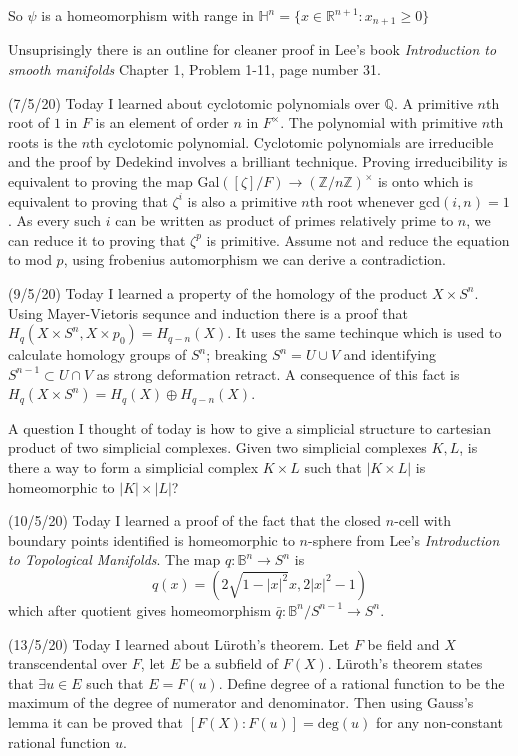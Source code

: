 \documentclass[12pt,a4paper]{article}
\begin{document}
So $\psi$ is a homeomorphism with range in $\mathbb{H}^n = \{x\in \mathbb{R}^{n+1} : x_{n+1} \ge 0\}$

Unsuprisingly there is an outline for cleaner proof in Lee's book \textit{Introduction to smooth manifolds} Chapter 1, Problem 1-11, page number 31.

(7/5/20) Today I learned about cyclotomic polynomials over $\mathbb{Q}$. 
A primitive $n$th root of $1$ in $F$ is an element of order $n$ in $F^{\times}$. The polynomial with primitive $n$th roots is the $n$th cyclotomic polynomial. Cyclotomic polynomials are irreducible and the proof by Dedekind involves a brilliant technique. Proving irreducibility is equivalent to proving the map Gal$([\zeta]/F) \rightarrow (\mathbb{Z}/n\mathbb{Z})^{\times}$ is onto which is equivalent to proving that $\zeta^i$ is also a primitive $n$th root whenever gcd$(i,n)=1$. As every such $i$ can be written as product of primes relatively prime to $n$, we can reduce it to proving that $\zeta^p$ is primitive. Assume not and reduce the equation to mod $p$, using frobenius automorphism we can derive a contradiction.

(9/5/20) Today I learned a property of the homology of the product $X\times S^{n}$. Using Mayer-Vietoris sequnce and induction there is a proof that $H_q(X\times S^n, X \times p_0) = H_{q-n}(X)$. It uses the same techinque which is used to calculate homology groups of $S^n$; breaking $S^n = U \cup V$ and identifying $S^{n-1} \subset U\cap V$ as strong deformation retract. A consequence of this fact is $H_q(X\times S^n) = H_q(X)\oplus H_{q-n}(X)$.

A question I thought of today is how to give a simplicial structure to cartesian product of two simplicial complexes. Given two simplicial complexes $K,L$, is there a way to form a simplicial complex $K\times L$ such that $|K \times L|$ is homeomorphic to $|K| \times |L|$?

(10/5/20) Today I learned a proof of the fact that the closed $n$-cell with boundary points identified is homeomorphic to $n$-sphere from Lee's \textit{Introduction to Topological Manifolds}. The map $q: \mathbb{B}^n \to S^n$ is $$q(x) = (2\sqrt{1-|x|^2}x,2|x|^2-1)$$ which after quotient gives homeomorphism $\bar{q}: \mathbb{B}^n/S^{n-1} \to S^n$.

(13/5/20) Today I learned about L\"{u}roth's theorem. Let $F$ be field and $X$ transcendental over $F$, let $E$ be a subfield of $F(X)$. L\"{u}roth's theorem states that $\exists u \in E$ such that $E=F(u)$. Define degree of a rational function to be the maximum of the degree of numerator and denominator. Then using Gauss's lemma it can be proved that $[F(X):F(u)] = \text{deg}(u)$ for any non-constant rational function $u$.
\end{document}
